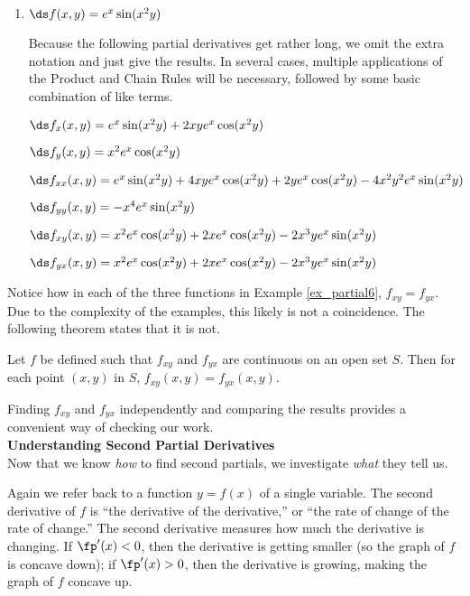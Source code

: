 {\begin{enumerate}
		$\ds f_{yx}(x,y) = \frac{\partial}{\px}\big(f_x\big) = \frac{\partial}{\px}\big(-\frac{2x^3}{y^3}\big) = 
-\frac{6x^2}{y^3}$	

\item	$\ds f(x,y) = e^x\sin(x^2y)$

  Because the following partial derivatives get rather long, we omit the extra notation and just give the results. In several cases, multiple applications of the Product and Chain Rules will be necessary, followed by some basic combination of like terms.

$\ds f_x(x,y) = e^x\sin(x^2y) + 2xye^x\cos(x^2y)$
	
	$\ds f_y(x,y) = x^2e^x\cos(x^2y)$
	
	$\ds f_{xx}(x,y) = e^x\sin(x^2y)+4xye^x\cos(x^2y)+2ye^x\cos(x^2y)-4x^2y^2e^x\sin(x^2y)$ 
	
	
		$\ds f_{yy}(x,y) =  -x^4e^x\sin(x^2y)$
		
		$\ds f_{xy}(x,y) = x^2e^x\cos(x^2y)+2xe^x\cos(x^2y)-2x^3ye^x\sin(x^2y)$
		
		$\ds f_{yx}(x,y) = x^2e^x\cos(x^2y)+2xe^x\cos(x^2y)-2x^3ye^x\sin(x^2y)$
	
\end{enumerate}
\baselineskip
}
\clearpage

Notice how in each of the three functions in Example \ref{ex_partial6}, $f_{xy} = f_{yx}$. Due to the complexity of the examples, this likely is not a coincidence. The following theorem states that it is not.

{Let $f$ be defined such that $f_{xy}$ and $f_{yx}$ are continuous on an open set $S$. Then for each point $(x,y)$ in $S$, $f_{xy}(x,y) = f_{yx}(x,y)$.
}

Finding $f_{xy}$ and $f_{yx}$ independently and comparing the results provides a convenient way of checking our work.\\

\noindent\textbf{\large Understanding Second Partial Derivatives}\\

Now that we know \textit{how} to find second partials, we investigate \textit{what} they tell us. 

Again we refer back to a function $y=f(x)$ of a single variable. The second derivative of $f$ is ``the derivative of the derivative,'' or ``the rate of change of the rate of change.'' The second derivative measures how much the derivative is changing. If $\fp'(x)<0$, then the derivative is getting smaller (so the graph of $f$ is concave down); if $\fp'(x)>0$, then the derivative is growing, making the graph of $f$ concave up. 

